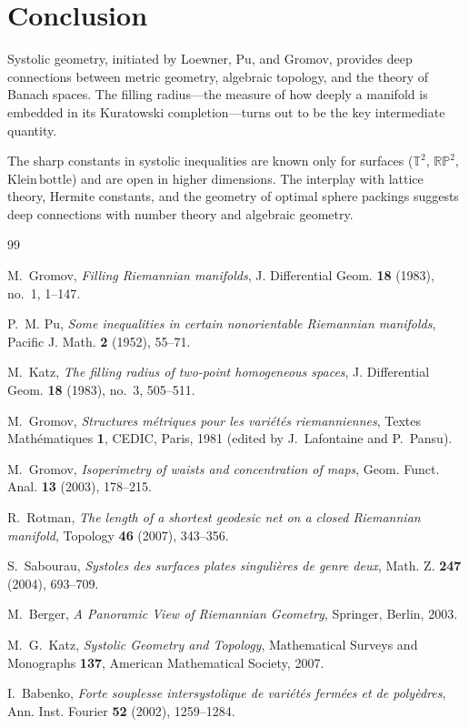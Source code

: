 \documentclass[12pt,a4paper]{amsart}
\theoremstyle{definition}
\theoremstyle{remark}
\newcommand{\RP}{\mathbb{RP}}
\newcommand{\TT}{\mathbb{T}}
\begin{document}
\section{Conclusion}

Systolic geometry, initiated by Loewner, Pu, and Gromov, provides deep
connections between metric geometry, algebraic topology, and the theory of
Banach spaces.  The filling radius---the measure of how deeply a manifold is
embedded in its Kuratowski completion---turns out to be the key intermediate
quantity.

The sharp constants in systolic inequalities are known only for surfaces
($\TT^2$, $\RP^2$, $\mathrm{Klein\,bottle}$) and are open in higher
dimensions.  The interplay with lattice theory, Hermite constants, and
the geometry of optimal sphere packings suggests deep connections with
number theory and algebraic geometry.

\begin{thebibliography}{99}

M.~Gromov,
\textit{Filling Riemannian manifolds},
J. Differential Geom. \textbf{18} (1983), no.~1, 1--147.

P.~M. Pu,
\textit{Some inequalities in certain nonorientable Riemannian manifolds},
Pacific J. Math. \textbf{2} (1952), 55--71.

M.~Katz,
\textit{The filling radius of two-point homogeneous spaces},
J. Differential Geom. \textbf{18} (1983), no.~3, 505--511.

M.~Gromov,
\textit{Structures métriques pour les variétés riemanniennes},
Textes Mathématiques \textbf{1}, CEDIC, Paris, 1981
(edited by J.\ Lafontaine and P.\ Pansu).

M.~Gromov,
\textit{Isoperimetry of waists and concentration of maps},
Geom. Funct. Anal. \textbf{13} (2003), 178--215.

R.~Rotman,
\textit{The length of a shortest geodesic net on a closed Riemannian manifold},
Topology \textbf{46} (2007), 343--356.

S.~Sabourau,
\textit{Systoles des surfaces plates singulières de genre deux},
Math. Z. \textbf{247} (2004), 693--709.

M.~Berger,
\textit{A Panoramic View of Riemannian Geometry},
Springer, Berlin, 2003.

M.~G.~Katz,
\textit{Systolic Geometry and Topology},
Mathematical Surveys and Monographs \textbf{137},
American Mathematical Society, 2007.

I.~Babenko,
\textit{Forte souplesse intersystolique de variétés fermées et de polyèdres},
Ann. Inst. Fourier \textbf{52} (2002), 1259--1284.

\end{thebibliography}
\end{document}
